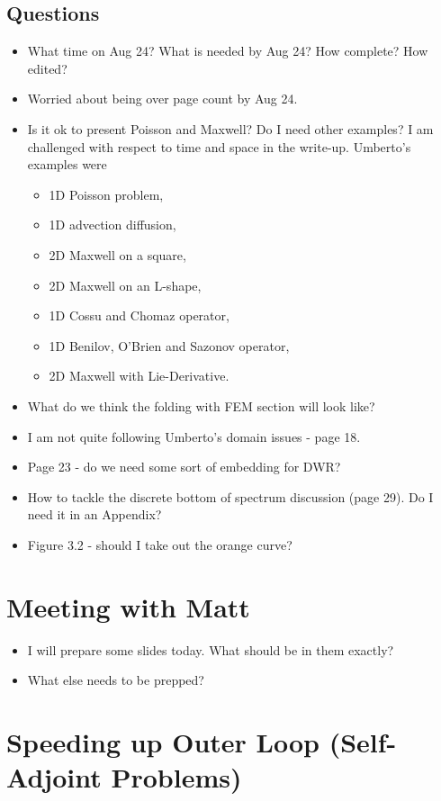 \documentclass[12pt,a4paper]{article}
\begin{document}
\subsection{Questions}
\begin{itemize}
\item What time on Aug 24? What is needed by Aug 24? How complete? How edited? 
\item Worried about being over page count by Aug 24.
\item  Is it ok to present Poisson and Maxwell? Do I need other examples? I am challenged with respect to time and space in the write-up. Umberto's examples were
    \begin{itemize}
        \item 1D Poisson problem,
        \item 1D advection diffusion,
        \item 2D Maxwell on a square,
        \item 2D Maxwell on an L-shape,
        \item 1D Cossu and Chomaz operator,
        \item 1D Benilov, O'Brien and Sazonov operator,
        \item 2D Maxwell with Lie-Derivative. 
    \end{itemize}
\item What do we think the folding with FEM section will look like?
\item I am not quite following Umberto's domain issues - page 18.
\item Page 23 - do we need some sort of embedding for DWR?
\item How to tackle the discrete bottom of spectrum discussion (page 29). Do I need it in an Appendix?
\item Figure 3.2 - should I take out the orange curve?
\end{itemize}

\section{Meeting with Matt}

\begin{itemize}
    \item I will prepare some slides today. What should be in them exactly?
    \item What else needs to be prepped? 
\end{itemize}


\section{Speeding up Outer Loop (Self-Adjoint Problems)}
\end{document}

